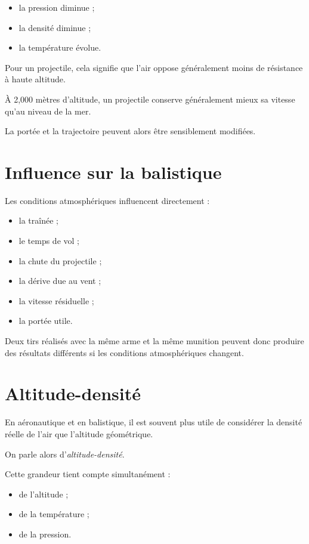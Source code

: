 \begin{itemize}
\item la pression diminue ;
\item la densité diminue ;
\item la température évolue.
\end{itemize}

Pour un projectile, cela signifie que l'air oppose généralement moins de
résistance à haute altitude.

\begin{exemple}

À 2,000 mètres d'altitude, un projectile conserve généralement mieux sa
vitesse qu'au niveau de la mer.

La portée et la trajectoire peuvent alors être sensiblement modifiées.

\end{exemple}

\section{Influence sur la balistique}

Les conditions atmosphériques influencent directement :

\begin{itemize}
\item la traînée ;
\item le temps de vol ;
\item la chute du projectile ;
\item la dérive due au vent ;
\item la vitesse résiduelle ;
\item la portée utile.
\end{itemize}

Deux tirs réalisés avec la même arme et la même munition peuvent donc produire
des résultats différents si les conditions atmosphériques changent.

\section{Altitude-densité}

En aéronautique et en balistique, il est souvent plus utile de considérer
la densité réelle de l'air que l'altitude géométrique.

On parle alors d'\emph{altitude-densité}.

Cette grandeur tient compte simultanément :

\begin{itemize}
\item de l'altitude ;
\item de la température ;
\item de la pression.
\end{itemize}

